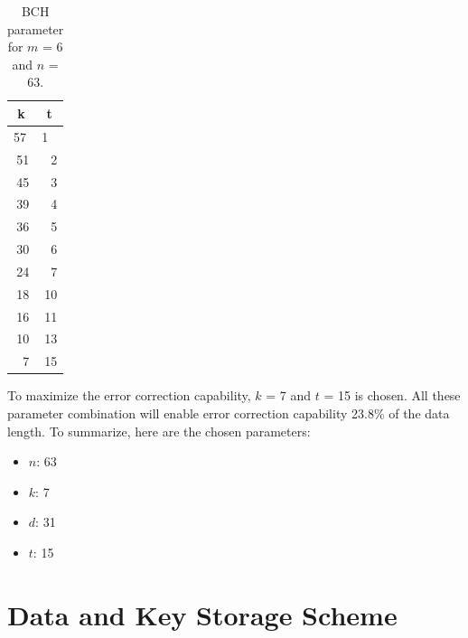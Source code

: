 \begin{table}[htbp]
  \centering
  \caption{BCH parameter for $m$ = 6 and $n$ = 63.}
    \begin{tabular}{|r|r|}
    \hline
    \multicolumn{1}{|c|}{\textbf{k}} & \multicolumn{1}{c|}{\textbf{t}} \\
    \hline
    \multicolumn{1}{|l|}{57} & \multicolumn{1}{l|}{1} \\
    \hline
    51    & 2 \\
    \hline
    45    & 3 \\
    \hline
    39    & 4 \\
    \hline
    36    & 5 \\
    \hline
    30    & 6 \\
    \hline
    24    & 7 \\
    \hline
    18    & 10 \\
    \hline
    16    & 11 \\
    \hline
    10    & 13 \\
    \hline
    7     & 15 \\
    \hline
    \end{tabular}%
  \label{tab:bch}%
\end{table}%
To maximize the error correction capability, $k$ = 7 and $t$ = 15 is chosen. All these parameter combination will enable error correction capability 23.8\% of the data length. To summarize, here are the chosen parameters:
\begin{itemize}
\item $n$: 63
\item $k$: 7
\item $d$: 31
\item $t$: 15
\end{itemize}

\section{Data and Key Storage Scheme} \label{chp:data_protection_scheme}

